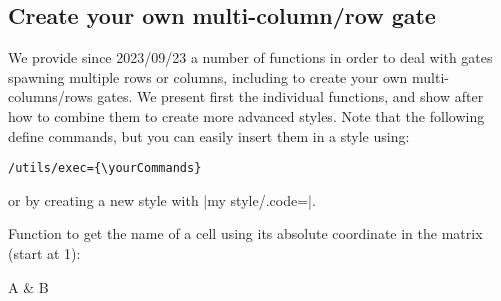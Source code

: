 \documentclass[a4paper,doc2]{ltxdoc} %
\begin{document}
{\begin{pgfmanualentry}
\end{pgfmanualentry}




\subsection{Create your own multi-column/row gate}

We provide since 2023/09/23 a number of functions in order to deal with gates spawning multiple rows or columns, including to create your own multi-columns/rows gates. We present first the individual functions, and show after how to combine them to create more advanced styles. Note that the following define commands, but you can easily insert them in a style using:
\begin{verbatim}
/utils/exec={\yourCommands}
\end{verbatim}
or by creating a new style with |my style/.code={\yourCommand}|.

\begin{pgfmanualentry}
  \extractcommand\zxGetNameAbsoluteNode{}\@@
  \pgfmanualbody%
  Function to get the name of a cell using its absolute coordinate in the matrix (start at 1):
\begin{codeexample}[]
\begin{ZX}[
  execute at end picture={
    \node[draw, rounded corners, fill=orange,
    node on layer=background,
    fit=(\zxGetNameAbsoluteNode{1}{1})(\zxGetNameAbsoluteNode{1}{2})
    ]{};
  }]
  A & B
\end{ZX}
\end{codeexample}
\end{pgfmanualentry}

}
\end{document}
